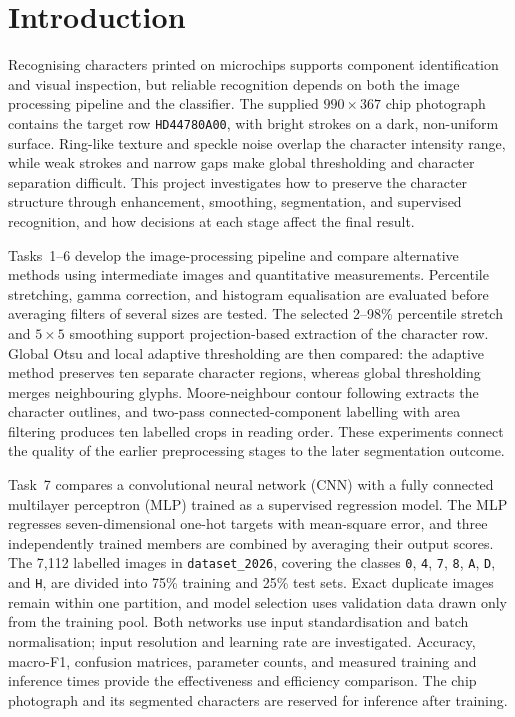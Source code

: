 \documentclass[11pt,a4paper]{article}
\numberwithin{figure}{section}
\numberwithin{table}{section}
\numberwithin{equation}{section}
\begin{document}
\section{Introduction}
\label{sec:introduction}
Recognising characters printed on microchips supports component identification
and visual inspection, but reliable recognition depends on both the image
processing pipeline and the classifier.  The supplied $990\times367$ chip
photograph contains the target row \texttt{HD44780A00}, with bright strokes on
a dark, non-uniform surface.  Ring-like texture and speckle noise overlap the
character intensity range, while weak strokes and narrow gaps make global
thresholding and character separation difficult.  This project investigates
how to preserve the character structure through enhancement, smoothing,
segmentation, and supervised recognition, and how decisions at each stage
affect the final result.

Tasks~1--6 develop the image-processing pipeline and compare alternative
methods using intermediate images and quantitative measurements.  Percentile
stretching, gamma correction, and histogram equalisation are evaluated before
averaging filters of several sizes are tested.  The selected 2--98\%
percentile stretch and $5\times5$ smoothing support projection-based
extraction of the character row.  Global Otsu and local adaptive thresholding
are then compared: the adaptive method preserves ten separate character
regions, whereas global thresholding merges neighbouring glyphs.
Moore-neighbour contour following extracts the character outlines, and
two-pass connected-component labelling with area filtering produces ten
labelled crops in reading order.  These experiments connect the quality of
the earlier preprocessing stages to the later segmentation outcome.

Task~7 compares a convolutional neural network (CNN) with a fully connected
multilayer perceptron (MLP) trained as a supervised regression model.  The MLP
regresses seven-dimensional one-hot targets with mean-square error, and three
independently trained members are combined by averaging their output scores.
The 7,112 labelled images in \texttt{dataset\_2026}, covering the classes
\texttt{0}, \texttt{4}, \texttt{7}, \texttt{8}, \texttt{A}, \texttt{D}, and
\texttt{H}, are divided into 75\% training and 25\% test sets.  Exact duplicate
images remain within one partition, and model selection uses validation data
drawn only from the training pool.  Both networks use input standardisation
and batch normalisation; input resolution and learning rate are investigated.
Accuracy, macro-F1, confusion matrices, parameter counts, and measured
training and inference times provide the effectiveness and efficiency
comparison.  The chip photograph and its segmented characters are reserved
for inference after training.
\end{document}
